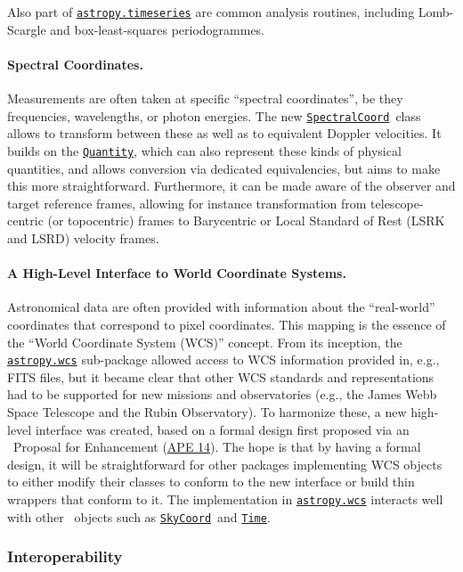 \documentclass[modern]{aastex631}
\newcommand{\astropysubpkg}[1]{\href{http://docs.astropy.org/en/stable/#1/index.html}{\texttt{astropy.#1}}\xspace}
\newcommand{\astropyapi}[2]{\href{https://docs.astropy.org/en/stable/api/astropy.#1.html}{#2}}
\newcommand{\astropyapidoc}[2]{\astropyapi{#1}{\texttt{#2}\xspace}}
\newcommand{\astropySpectralCoord}{\astropyapidoc{coordinates.SpectralCoord}{SpectralCoord}}
\newcommand{\astropySkyCoord}{\astropyapidoc{coordinates.SkyCoord}{SkyCoord}}
\newcommand{\astropyTime}{\astropyapidoc{time.Time}{Time}}
\newcommand{\astropyQuantity}{\astropyapidoc{units.Quantity}{Quantity}}
\newcommand{\astropyAPE}[1]{\href{https://github.com/astropy/astropy-APEs/blob/main/APE#1.rst}{APE #1}\xspace}
\begin{document}
Also part of \astropysubpkg{timeseries} are common analysis routines,
including Lomb-Scargle and box-least-squares periodogrammes.

\paragraph{Spectral Coordinates.} Measurements are often taken at
specific ``spectral coordinates'', be they frequencies, wavelengths,
or photon energies.  The new \astropySpectralCoord\ class allows to
transform between these as well as to equivalent Doppler velocities.
It builds on the \astropyQuantity, which can also represent these
kinds of physical quantities, and allows conversion via dedicated
equivalencies, but aims to make this more straightforward.
Furthermore, it can be made aware of the observer and target reference
frames, allowing for instance transformation from telescope-centric (or
topocentric) frames to Barycentric or Local Standard of Rest
(LSRK and LSRD) velocity frames.

\paragraph{A High-Level Interface to World Coordinate Systems.}
Astronomical data are often provided with information about the
``real-world'' coordinates that correspond to pixel coordinates. This
mapping is the essence of the ``World Coordinate System (WCS)''
concept.  From its inception, the \astropysubpkg{wcs} sub-package
allowed access to WCS information provided in, e.g., FITS files, but
it became clear that other WCS standards and representations had to be
supported for new missions and observatories (e.g., the James Webb
Space Telescope and the Rubin Observatory).  To harmonize these, a new
high-level interface was created, based on a formal design first
proposed via an \astropy\ Proposal for Enhancement (\astropyAPE{14}).
The hope is that by having a formal design, it will be straightforward
for other packages implementing WCS objects to either modify their
classes to conform to the new interface or build thin wrappers that
conform to it.  The implementation in \astropysubpkg{wcs} interacts
well with other \astropypkg\ objects such as \astropySkyCoord\ and
\astropyTime.

\subsubsection*{Interoperability} \label{sec:core-features-interoperability}
\end{document}
